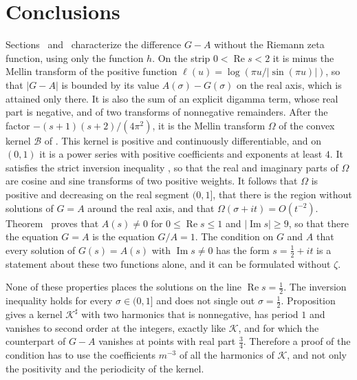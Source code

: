 \section{Conclusions}\label{sec:concl}

Sections~ and~ characterize the difference $G-A$ without the Riemann zeta function, using only the function $h$. On the strip $0<\operatorname{Re}s<2$ it is minus the Mellin transform  of the positive function $\ell(u)=\log(\pi u/|\sin(\pi u)|)$, so that $|G-A|$ is bounded by its value $A(\sigma)-G(\sigma)$ on the real axis, which is attained only there. It is also the sum  of an explicit digamma term, whose real part is negative, and of two transforms of nonnegative remainders. After the factor $-(s+1)(s+2)/(4\pi^2)$, it is the Mellin transform $\Omega$ of the convex kernel $\mathcal B$ of . This kernel is positive and continuously differentiable, and on $(0,1)$ it is a power series with positive coefficients and exponents at least $4$. It satisfies the strict inversion inequality , so that the real and imaginary parts of $\Omega$ are cosine and sine transforms of two positive weights. It follows that $\Omega$ is positive and decreasing on the real segment $(0,1]$, that there is the region  without solutions of $G=A$ around the real axis, and that $\Omega(\sigma+it)=O(t^{-2})$. Theorem~ proves that $A(s)\ne0$ for $0\le\operatorname{Re}s\le1$ and $|\operatorname{Im}s|\ge9$, so that there the equation $G=A$ is the equation $G/A=1$. The condition on $G$ and $A$ that every solution of $G(s)=A(s)$ with $\operatorname{Im}s\ne0$ has the form $s=\frac12+it$ is a statement about these two functions alone, and it can be formulated without $\zeta$.

None of these properties places the solutions on the line $\operatorname{Re}s=\frac12$. The inversion inequality holds for every $\sigma\in(0,1]$ and does not single out $\sigma=\frac12$. Proposition~ gives a kernel $\mathcal K^\sharp$ with two harmonics that is nonnegative, has period $1$ and vanishes to second order at the integers, exactly like $\mathcal K$, and for which the counterpart of $G-A$ vanishes at points with real part $\frac34$. Therefore a proof of the condition has to use the coefficients $m^{-3}$ of all the harmonics of $\mathcal K$, and not only the positivity and the periodicity of the kernel.

